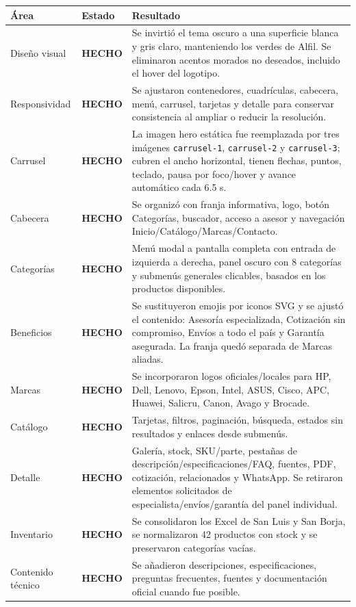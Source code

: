 \documentclass[11pt,a4paper]{article}
\newcommand{\ok}{\textcolor{done}{\textbf{HECHO}}}
\newcommand{\code}[1]{\nolinkurl{#1}}
\begin{document}
\begin{longtable}{L{2.8cm}L{4.2cm}L{8.0cm}}
\toprule
\textbf{Área} & \textbf{Estado} & \textbf{Resultado}\\
\midrule
\endhead
Diseño visual & \ok & Se invirtió el tema oscuro a una superficie blanca y gris claro, manteniendo los verdes de Alfil. Se eliminaron acentos morados no deseados, incluido el hover del logotipo.\\
Responsividad & \ok & Se ajustaron contenedores, cuadrículas, cabecera, menú, carrusel, tarjetas y detalle para conservar consistencia al ampliar o reducir la resolución.\\
Carrusel & \ok & La imagen hero estática fue reemplazada por tres imágenes \code{carrusel-1}, \code{carrusel-2} y \code{carrusel-3}; cubren el ancho horizontal, tienen flechas, puntos, teclado, pausa por foco/hover y avance automático cada 6.5 s.\\
Cabecera & \ok & Se organizó con franja informativa, logo, botón Categorías, buscador, acceso a asesor y navegación Inicio/Catálogo/Marcas/Contacto.\\
Categorías & \ok & Menú modal a pantalla completa con entrada de izquierda a derecha, panel oscuro con 8 categorías y submenús generales clicables, basados en los productos disponibles.\\
Beneficios & \ok & Se sustituyeron emojis por iconos SVG y se ajustó el contenido: Asesoría especializada, Cotización sin compromiso, Envíos a todo el país y Garantía asegurada. La franja quedó separada de Marcas aliadas.\\
Marcas & \ok & Se incorporaron logos oficiales/locales para HP, Dell, Lenovo, Epson, Intel, ASUS, Cisco, APC, Huawei, Salicru, Canon, Avago y Brocade.\\
Catálogo & \ok & Tarjetas, filtros, paginación, búsqueda, estados sin resultados y enlaces desde submenús.\\
Detalle & \ok & Galería, stock, SKU/parte, pestañas de descripción/especificaciones/FAQ, fuentes, PDF, cotización, relacionados y WhatsApp. Se retiraron elementos solicitados de especialista/envíos/garantía del panel individual.\\
Inventario & \ok & Se consolidaron los Excel de San Luis y San Borja, se normalizaron 42 productos con stock y se preservaron categorías vacías.\\
Contenido técnico & \ok & Se añadieron descripciones, especificaciones, preguntas frecuentes, fuentes y documentación oficial cuando fue posible.\\

\end{longtable}
\end{document}

